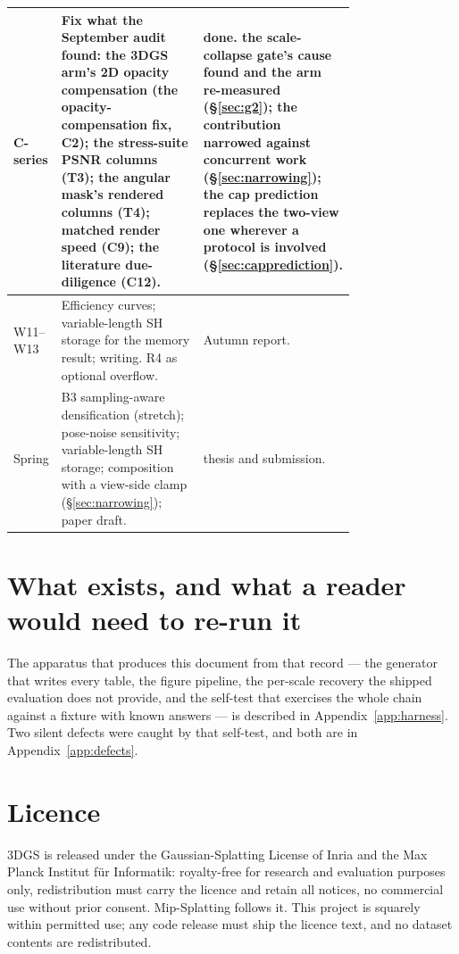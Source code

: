\begin{table}[htbp]
\begin{tabular}{lp{0.42\linewidth}p{0.34\linewidth}}
    \midrule
    C-series & Fix what the September audit found: the 3DGS arm's 2D opacity compensation (the opacity-compensation fix, C2); the stress-suite PSNR columns (T3); the angular mask's rendered columns (T4); matched render speed (C9); the literature due-diligence (C12). & \textbf{done.} the scale-collapse gate's cause found and the arm re-measured (\S\ref{sec:g2}); the contribution narrowed against concurrent work (\S\ref{sec:narrowing}); the cap prediction replaces the two-view one wherever a protocol is involved (\S\ref{sec:capprediction}). \\
    \midrule
    W11--W13 & Efficiency curves; variable-length SH storage for the memory result; writing. R4 as optional overflow. & Autumn report. \\
    Spring & B3 sampling-aware densification (stretch); pose-noise sensitivity; variable-length SH storage; composition with a view-side clamp (\S\ref{sec:narrowing}); paper draft. & thesis and submission. \\
    \bottomrule
  \end{tabular}
\end{table}

\section{What exists, and what a reader would need to re-run it}
The apparatus that produces this document from that record --- the generator
that writes every table, the figure pipeline, the per-scale recovery the
shipped evaluation does not provide, and the self-test that exercises the whole
chain against a fixture with known answers --- is described in
Appendix~\ref{app:harness}. Two silent defects were caught by that self-test, and both are in Appendix~\ref{app:defects}.

\section{Licence}
3DGS is released under the Gaussian-Splatting License of Inria and the Max Planck
Institut f\"ur Informatik: royalty-free for research and evaluation purposes
only, redistribution must carry the licence and retain all notices, no commercial
use without prior consent. Mip-Splatting follows it. This project is squarely
within permitted use; any code release must ship the licence text, and no dataset
contents are redistributed.
